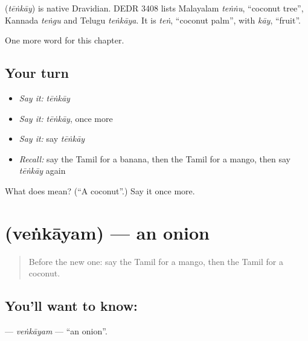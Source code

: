 \begin{cousinweb}
\textbf{} (\emph{tēṅkāy}) is native Dravidian. DEDR 3408 lists Malayalam \emph{teṅṅu}, \textquotedblleft{}coconut tree\textquotedblright{}, Kannada \emph{teṅgu} and Telugu \emph{teṅkāya}. It is \emph{teṅ}, \textquotedblleft{}coconut palm\textquotedblright{}, with \emph{kāy}, \textquotedblleft{}fruit\textquotedblright{}.
\end{cousinweb}

\begin{grammarlens}[title={What you've built}]
One more word for this chapter.
\end{grammarlens}

\subsection*{Your turn}
\begin{itemize}
\raggedright
  \item \emph{Say it:} \emph{tēṅkāy}
  \item \emph{Say it:} \emph{tēṅkāy}, once more
  \item \emph{Say it:} say \emph{tēṅkāy}
  \item \emph{Recall:} say the Tamil for a banana, then the Tamil for a mango, then say \emph{tēṅkāy} again
\end{itemize}

\begin{tcolorbox}[breakable,colback=teal!4,colframe=teal!35!black,title={Before you move on}]
What does  mean? (\textquotedblleft{}A coconut\textquotedblright{}.) Say it once more.
\end{tcolorbox}
\section[\texorpdfstring{\ta{வெங்காயம்} (veṅkāyam)}{வெங்காயம் (veṅkāyam)}]{ (veṅkāyam) — an onion}

\label{lesson:TA-C123-venkayam}



\begin{quote}
Before the new one: say the Tamil for a mango, then the Tamil for a coconut.
\end{quote}

\subsection*{You'll want to know: }
\textbf{} — \emph{veṅkāyam} — \textquotedblleft{}an onion\textquotedblright{}.

